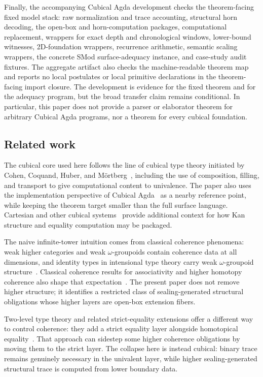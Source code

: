 \documentclass{lmcs}
\begin{document}
Finally, the accompanying Cubical Agda development checks the theorem-facing
fixed model stack: raw normalization and trace accounting, structural horn
decoding, the open-box and horn-computation packages, computational replacement,
wrappers for exact depth and chronological windows, lower-bound witnesses,
2D-foundation wrappers, recurrence arithmetic, semantic scaling
wrappers, the concrete SMod surface-adequacy instance, and case-study audit
fixtures.  The aggregate artifact also checks the machine-readable theorem map
and reports no local postulates or local primitive declarations in the
theorem-facing import closure.  The development is evidence for the fixed
theorem and for the adequacy program, but the broad transfer claim remains
conditional.  In particular, this paper does not provide a parser or elaborator
theorem for arbitrary Cubical Agda programs, nor a theorem for every cubical
foundation.


\subsection{Related work}
\label{subsec:related-work}

The cubical core used here follows the line of cubical type theory initiated by
Cohen, Coquand, Huber, and M{\"o}rtberg~\cite{cubical}, including the use of
composition, filling, and transport to give computational content to
univalence.  The paper also uses the implementation perspective of Cubical
Agda~\cite{cubical-agda} as a nearby reference point, while keeping the theorem
target smaller than the full surface language.  Cartesian and other cubical
systems~\cite{cartesian-cubical,xtt} provide additional context for how Kan
structure and equality computation may be packaged.

The naive infinite-tower intuition comes from classical coherence phenomena:
weak higher categories and weak \(\omega\)-groupoids contain coherence data at
all dimensions, and identity types in intensional type theory carry weak
\(\omega\)-groupoid structure~\cite{lumsdaine,vdberg-garner}.  Classical
coherence results for associativity and higher homotopy coherence also shape
that expectation~\cite{maclane-coherence,stasheff-i,stasheff-ii,kraus-vonraumer}.  The present
paper does not remove higher structure; it identifies a restricted class of
sealing-generated structural obligations whose higher layers are open-box
extension fibers.

Two-level type theory and related strict-equality extensions offer a different
way to control coherence: they add a strict equality layer alongside homotopical
equality~\cite{altenkirch-strict,annenkov-2ltt}.  That approach can sidestep
some higher coherence obligations by moving them to the strict layer.  The
collapse here is instead cubical: binary trace remains genuinely necessary in
the univalent layer, while higher sealing-generated structural trace is computed
from lower boundary data.
\end{document}
